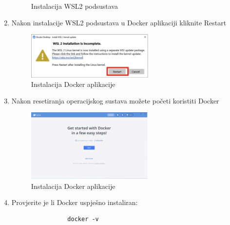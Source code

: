 \begin{enumerate}
\begin{figure}[h]
				\caption{Instalacija WSL2 podsustava}
			\end{figure}
			\newpage
			\item Nakon instalacije WSL2 podsustava u Docker aplikaciji kliknite Restart
			\begin{figure}[h]
				\centering
				\includegraphics[width=0.6\textwidth]{slike/docker_install/10.png}
				\caption{Instalacija Docker aplikacije}
			\end{figure}
			\item Nakon resetiranja operacijskog sustava možete početi koristiti Docker
			\begin{figure}[h]
				\centering
				\includegraphics[width=0.6\textwidth]{slike/docker_install/11.png}
				\caption{Instalacija Docker aplikacije}
			\end{figure}
			\item Provjerite je li Docker uspješno instaliran:
			\begin{verbatim}
				docker -v
			\end{verbatim}
		\end{enumerate}

